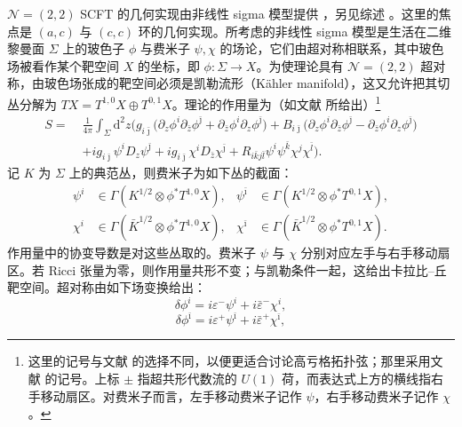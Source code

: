 $\mathcal{N}=(2,2)$ SCFT 的几何实现由非线性 sigma 模型提供 \cite{ref35,ref6}，另见综述 \cite{ref9,ref31,ref10}。这里的焦点是 $(a,c)$ 与 $(c,c)$ 环的几何实现。所考虑的非线性 sigma 模型是生活在二维黎曼面 $\Sigma$ 上的玻色子 $\phi$ 与费米子 $\psi,\chi$ 的场论，它们由超对称相联系，其中玻色场被看作某个靶空间 $X$ 的坐标，即 $\phi:\Sigma\to X$。为使理论具有 $\mathcal{N}=(2,2)$ 超对称，由玻色场张成的靶空间必须是凯勒流形（Kähler manifold），这又允许把其切丛分解为 $TX=T^{1,0}X\oplus T^{0,1}X$。理论的作用量为（如文献 \cite{ref6,ref10} 所给出）\footnote{这里的记号与文献 \cite{ref6,ref10} 的选择不同，以便更适合讨论高亏格拓扑弦；那里采用文献 \cite{ref19} 的记号。上标 $\pm$ 指超共形代数流的 $U(1)$ 荷，而表达式上方的横线指右手移动扇区。对费米子而言，左手移动费米子记作 $\psi$，右手移动费米子记作 $\chi$。}
\begin{equation}\tag{2.30}
\begin{aligned}
S=\;&\frac{1}{4\pi}\int_{\Sigma}\mathrm{d}^{2}z\Big(g_{i\bar{\jmath}}\big(\partial_{z}\phi^{i}\partial_{\bar{z}}\phi^{\bar{\jmath}}+\partial_{\bar{z}}\phi^{i}\partial_{z}\phi^{\bar{\jmath}}\big)+B_{i\bar{\jmath}}\big(\partial_{z}\phi^{i}\partial_{\bar{z}}\phi^{\bar{\jmath}}-\partial_{\bar{z}}\phi^{i}\partial_{z}\phi^{\bar{\jmath}}\big)\\
&+ig_{i\bar{\jmath}}\psi^{i}D_{z}\psi^{\bar{\jmath}}+ig_{i\bar{\jmath}}\chi^{i}D_{\bar{z}}\chi^{\bar{\jmath}}+R_{i\bar{k}j\bar{l}}\psi^{i}\psi^{\bar{k}}\chi^{j}\chi^{\bar{l}}\Big).
\end{aligned}
\end{equation}
记 $K$ 为 $\Sigma$ 上的典范丛，则费米子为如下丛的截面：
\begin{equation}\tag{2.31}
\begin{aligned}
\psi^{i}&\in\Gamma(K^{1/2}\otimes\phi^{*}T^{1,0}X), & \psi^{\bar{\imath}}&\in\Gamma(K^{1/2}\otimes\phi^{*}T^{0,1}X),\\
\chi^{i}&\in\Gamma(\bar{K}^{1/2}\otimes\phi^{*}T^{1,0}X), & \chi^{\bar{\imath}}&\in\Gamma(\bar{K}^{1/2}\otimes\phi^{*}T^{0,1}X).
\end{aligned}
\end{equation}
作用量中的协变导数是对这些丛取的。费米子 $\psi$ 与 $\chi$ 分别对应左手与右手移动扇区。若 Ricci 张量为零，则作用量共形不变；与凯勒条件一起，这给出卡拉比--丘靶空间。超对称由如下场变换给出：
\begin{equation}\tag{2.32}
\delta\phi^{i}=i\varepsilon^{-}\psi^{i}+i\bar\varepsilon^{-}\chi^{i},
\end{equation}
\begin{equation}\tag{2.33}
\delta\phi^{\bar{\imath}}=i\varepsilon^{+}\psi^{\bar{\imath}}+i\bar\varepsilon^{+}\chi^{\bar{\imath}},
\end{equation}
